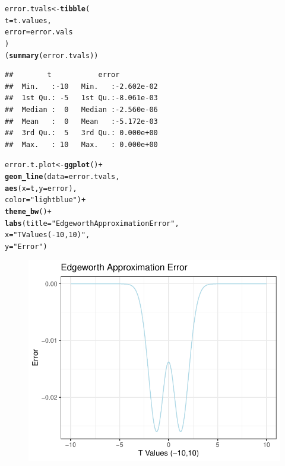 \documentclass{article}\usepackage[]{graphicx}\usepackage[]{xcolor}
\makeatletter
\def\maxwidth{ %
  \ifdim\Gin@nat@width>\linewidth
    \linewidth
  \else
    \Gin@nat@width
  \fi
}
\newcommand{\hlsng}[1]{\textcolor[rgb]{0.192,0.494,0.8}{#1}}%
\newcommand{\hlopt}[1]{\textcolor[rgb]{0,0,0}{#1}}%
\newcommand{\hldef}[1]{\textcolor[rgb]{0.345,0.345,0.345}{#1}}%
\newcommand{\hlkwb}[1]{\textcolor[rgb]{0.69,0.353,0.396}{#1}}%
\newcommand{\hlkwc}[1]{\textcolor[rgb]{0.333,0.667,0.333}{#1}}%
\newcommand{\hlkwd}[1]{\textcolor[rgb]{0.737,0.353,0.396}{\textbf{#1}}}%
\newenvironment{kframe}{%
 \def\at@end@of@kframe{}%
 \ifinner\ifhmode%
  \def\at@end@of@kframe{\end{minipage}}%
  \begin{minipage}{\columnwidth}%
 \fi\fi%
 \def\FrameCommand##1{\hskip\@totalleftmargin \hskip-\fboxsep
 \colorbox{shadecolor}{##1}\hskip-\fboxsep
     \hskip-\linewidth \hskip-\@totalleftmargin \hskip\columnwidth}%
 \MakeFramed {\advance\hsize-\width
   \@totalleftmargin\z@ \linewidth\hsize
   \@setminipage}}%
 {\par\unskip\endMakeFramed%
 \at@end@of@kframe}
\newenvironment{knitrout}{}{} %
\makeatother
\begin{document}
\begin{enumerate}
\begin{enumerate}
\begin{knitrout}
\begin{kframe}
\begin{alltt}
\hldef{error.tvals} \hlkwb{<-} \hlkwd{tibble}\hldef{(}
  \hlkwc{t} \hldef{= t.values,}
  \hlkwc{error} \hldef{= error.vals}
\hldef{)}
\hldef{(}\hlkwd{summary}\hldef{(error.tvals))}
\end{alltt}
\begin{verbatim}
##        t           error           
##  Min.   :-10   Min.   :-2.602e-02  
##  1st Qu.: -5   1st Qu.:-8.061e-03  
##  Median :  0   Median :-2.560e-06  
##  Mean   :  0   Mean   :-5.172e-03  
##  3rd Qu.:  5   3rd Qu.: 0.000e+00  
##  Max.   : 10   Max.   : 0.000e+00
\end{verbatim}
\begin{alltt}
\hldef{error.t.plot} \hlkwb{<-} \hlkwd{ggplot}\hldef{()}\hlopt{+}
  \hlkwd{geom_line}\hldef{(}\hlkwc{data} \hldef{= error.tvals,}
            \hlkwd{aes}\hldef{(}\hlkwc{x} \hldef{= t,} \hlkwc{y} \hldef{= error),}
            \hlkwc{color} \hldef{=} \hlsng{"lightblue"}\hldef{)}\hlopt{+}
  \hlkwd{theme_bw}\hldef{()}\hlopt{+}
  \hlkwd{labs}\hldef{(}\hlkwc{title} \hldef{=} \hlsng{"Edgeworth Approximation Error"}\hldef{,}
       \hlkwc{x} \hldef{=} \hlsng{"T Values (-10,10)"}\hldef{,}
       \hlkwc{y} \hldef{=} \hlsng{"Error"}\hldef{)}
\end{alltt}
\end{kframe}
\end{knitrout}
\begin{figure}[H]
\begin{center}
\begin{knitrout}
\color{fgcolor}

{\centering \includegraphics[width=\maxwidth]{figure/unnamed-chunk-3-1} 

}
\end{knitrout}
\end{center}
\end{figure}
\end{enumerate}
\end{enumerate}
\end{document}
